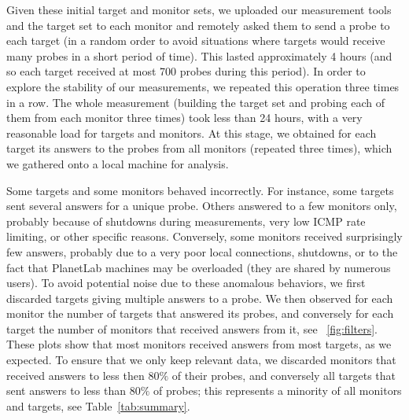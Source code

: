 \documentclass[conference]{IEEEtran}
\begin{document}
Given these initial target and monitor sets, we uploaded our measurement tools and the target set to each monitor and remotely asked them to send a probe to each target (in a random order to avoid situations where targets would receive many probes in a short period of time). This lasted approximately 4 hours (and so each target received at most 700 probes during this period). In order to explore the stability of our measurements, we repeated this operation three times in a row. The whole measurement (building the target set and probing each of them from each monitor three times) took less than 24 hours, with a very reasonable load for targets and monitors. At this stage, we obtained for each target its answers to the probes from all monitors (repeated three times), which we gathered onto a local machine for analysis.

Some targets and some monitors behaved incorrectly. For instance, some targets sent several answers for a unique probe. Others answered to a few monitors only, probably because of shutdowns during measurements, very low ICMP rate limiting, or other specific reasons. Conversely, some monitors received surprisingly few answers, probably due to a very poor local connections, shutdowns, or to the fact that PlanetLab machines may be overloaded (they are shared by numerous users). To avoid potential noise due to these anomalous behaviors, we first discarded targets giving multiple answers to a probe. We then observed for each monitor the number of targets that answered its probes, and conversely for each target the number of monitors that received answers from it, see \figurename~\ref{fig:filters}. These plots show that most monitors received answers from most targets, as we expected. To ensure that we only keep relevant data, we discarded monitors that received answers to less then $80\%$ of their probes, and conversely all targets that sent answers to less than $80\%$ of probes; this represents a minority of all monitors and targets, see Table~\ref{tab:summary}.
\end{document}
